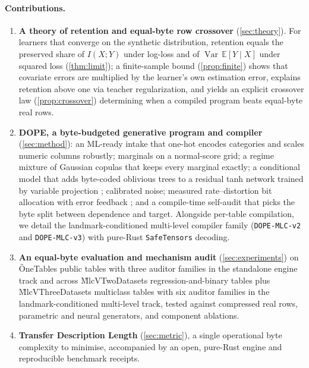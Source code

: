 \paragraph{Contributions.}
\begin{enumerate}[leftmargin=1.4em,itemsep=2pt,topsep=2pt]
\item \textbf{A theory of retention and equal-byte row crossover} (\cref{sec:theory}). For learners that
  converge on the synthetic distribution, retention equals the preserved share of $I(X;Y)$ under log-loss
  and of $\operatorname{Var}\,\mathbb{E}[Y\mid X]$ under squared loss (\cref{thm:limit}); a finite-sample
  bound (\cref{prop:finite}) shows that covariate errors are multiplied by the learner's own estimation
  error, explains retention above one via teacher regularization, and yields an explicit crossover law
  (\cref{prop:crossover}) determining when a compiled program beats equal-byte real rows.
\item \textbf{DOPE, a byte-budgeted generative program and compiler} (\cref{sec:method}): an ML-ready
  intake that one-hot encodes categories and scales numeric columns robustly; marginals on a normal-score
  grid; a regime mixture of Gaussian copulas that keeps every marginal exactly; a conditional model that
  adds byte-coded oblivious trees to a residual tanh network trained by variable projection
  \citep{golub1973varpro}; calibrated noise; measured rate--distortion bit allocation with error feedback
  \citep{frantar2023gptq}; and a compile-time self-audit that picks the byte split between dependence and
  target. Alongside per-table compilation, we detail the landmark-conditioned multi-level compiler family
  (\texttt{DOPE-MLC-v2} and \texttt{DOPE-MLC-v3}) with pure-Rust \texttt{SafeTensors} decoding.
\item \textbf{An equal-byte evaluation and mechanism audit} (\cref{sec:experiments}) on \G{OneTables}
  public tables with three auditor families in the standalone engine track and across \G{MlcVTwoDatasets}
  regression-and-binary tables plus \G{MlcVThreeDatasets} multiclass tables with six auditor families in
  the landmark-conditioned multi-level track, tested against compressed real rows, parametric and neural
  generators, and component ablations.
\item \textbf{Transfer Description Length} (\cref{sec:metric}), a single operational byte complexity to
  minimise, accompanied by an open, pure-Rust engine and reproducible benchmark receipts.
\end{enumerate}

